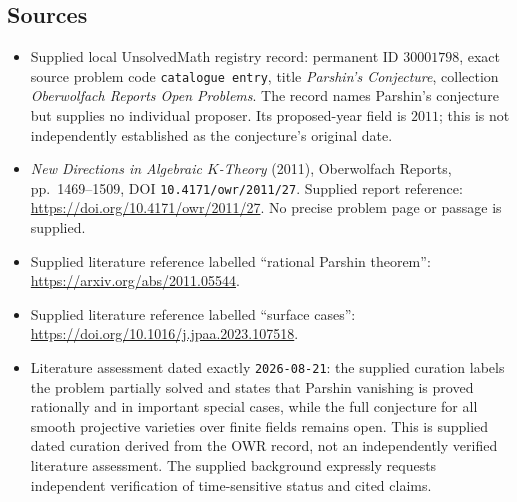 \documentclass[11pt]{article}
\begin{document}
\subsection{Sources}
\begin{itemize}
\item Supplied local UnsolvedMath registry record: permanent ID \(30001798\), exact source problem code \texttt{catalogue entry}, title \emph{Parshin's Conjecture}, collection \emph{Oberwolfach Reports Open Problems}. The record names Parshin's conjecture but supplies no individual proposer. Its proposed-year field is \(2011\); this is not independently established as the conjecture's original date.
\item \emph{New Directions in Algebraic \(K\)-Theory} (2011), Oberwolfach Reports, pp.~1469--1509, DOI \texttt{10.4171/owr/2011/27}. Supplied report reference: \url{https://doi.org/10.4171/owr/2011/27}. No precise problem page or passage is supplied.
\item Supplied literature reference labelled ``rational Parshin theorem'': \url{https://arxiv.org/abs/2011.05544}.
\item Supplied literature reference labelled ``surface cases'': \url{https://doi.org/10.1016/j.jpaa.2023.107518}.
\item Literature assessment dated exactly \texttt{2026-08-21}: the supplied curation labels the problem partially solved and states that Parshin vanishing is proved rationally and in important special cases, while the full conjecture for all smooth projective varieties over finite fields remains open. This is supplied dated curation derived from the OWR record, not an independently verified literature assessment. The supplied background expressly requests independent verification of time-sensitive status and cited claims.
\end{itemize}
\end{document}
